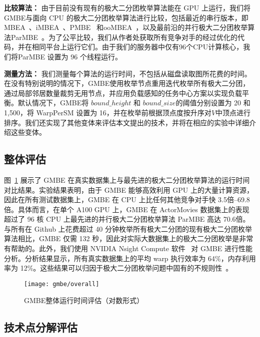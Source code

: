 \textbf{比较算法：} 由于目前没有现有的极大二分团枚举算法能在 GPU 上运行，我们将GMBE与面向 CPU 的极大二分团枚举算法进行比较，包括最近的串行版本，即 MBEA~\cite{iMBEA14}、iMBEA~\cite{iMBEA14}、PMBE~\cite{PMBE20} 和ooMBEA~\cite{ooMBE22}，以及最前沿的并行极大二分团枚举算法ParMBE~\cite{parMBE19}。为了公平比较，我们从作者处获取所有竞争对手的经过优化的代码，并在相同平台上运行它们。由于我们的服务器中仅有96个CPU计算核心，我们将ParMBE 设置为 96 个线程运行。

\textbf{测量方法：} 我们测量每个算法的运行时间，不包括从磁盘读取图所花费的时间。在没有特别说明的情况下，GMBE使用枚举节点重用迭代枚举所有极大二分团，通过局部邻居数量裁剪无用节点，并应用负载感知的任务中心方案以实现负载平衡。默认情况下，GMBE将 $bound\_height$ 和 $bound\_size$的阈值分别设置为 20 和 1,500，将 \textsf{WarpPerSM} 设置为 16，并在枚举前根据顶点度按升序对$V$中顶点进行排序。我们还实现了其他变体来评估本文提出的技术，并将在相应的实验中详细介绍这些变体。


\subsection{整体评估}

图~\ref{fig:gmbe_exp_overall} 展示了 GMBE 在真实数据集上与最先进的极大二分团枚举算法的运行时间对比结果。实验结果表明，由于 GMBE 能够高效利用 GPU 上的大量计算资源，因此在所有测试数据集上，GMBE 在 CPU 上比任何其他竞争对手快 3.5倍--69.8倍。具体而言，在单个 A100 GPU 上，GMBE 在 ActorMovies 数据集上的表现超过了 96 核 CPU 上最先进的并行极大二分团枚举算法 ParMBE 高达 70.6倍。与所有在 Github 上花费超过 40 分钟枚举所有极大二分团的现有极大二分团枚举算法相比，GMBE 仅需 132 秒，因此对实际大数据集上的极大二分团枚举是非常有帮助的。此外，我们使用 NVIDIA Nsight Compute 软件~\cite{Nsight} 对 GMBE 进行性能分析。分析结果显示，所有真实数据集上的平均 warp 执行效率为 64\%，内存利用率为 12\%。这些结果可以归因于极大二分团枚举问题中固有的不规则性~\cite{Irregularity12}。

\begin{figure} [t]
  \center
		\texttt{[image: gmbe/overall]}
	\caption{GMBE整体运行时间评估（对数形式）}
	\label{fig:gmbe_exp_overall}
\end{figure}





\subsection{技术点分解评估}
\label{subsec:gmbe_breakdown}

